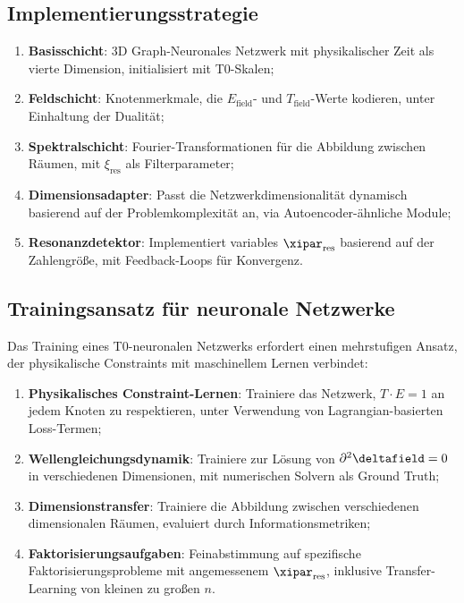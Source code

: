 \subsection{Implementierungsstrategie}
\label{subsec:implementation_strategy}
\begin{application}
	\begin{enumerate}
		\item \textbf{Basisschicht}: 3D Graph-Neuronales Netzwerk mit physikalischer Zeit als vierte Dimension, initialisiert mit T0-Skalen;
		\item \textbf{Feldschicht}: Knotenmerkmale, die $E_{\text{field}}$- und $T_{\text{field}}$-Werte kodieren, unter Einhaltung der Dualität;
		\item \textbf{Spektralschicht}: Fourier-Transformationen für die Abbildung zwischen Räumen, mit $\xi_{\text{res}}$ als Filterparameter;
		\item \textbf{Dimensionsadapter}: Passt die Netzwerkdimensionalität dynamisch basierend auf der Problemkomplexität an, via Autoencoder-ähnliche Module;
		\item \textbf{Resonanzdetektor}: Implementiert variables $\xipar_{\text{res}}$ basierend auf der Zahlengröße, mit Feedback-Loops für Konvergenz.
	\end{enumerate}
\end{application}
\subsection{Trainingsansatz für neuronale Netzwerke}
\label{subsec:training_approach}
Das Training eines T0-neuronalen Netzwerks erfordert einen mehrstufigen Ansatz, der physikalische Constraints mit maschinellem Lernen verbindet:
\begin{enumerate}
	\item \textbf{Physikalisches Constraint-Lernen}: Trainiere das Netzwerk, $T \cdot E = 1$ an jedem Knoten zu respektieren, unter Verwendung von Lagrangian-basierten Loss-Termen;
	\item \textbf{Wellengleichungsdynamik}: Trainiere zur Lösung von $\partial^2 \deltafield = 0$ in verschiedenen Dimensionen, mit numerischen Solvern als Ground Truth;
	\item \textbf{Dimensionstransfer}: Trainiere die Abbildung zwischen verschiedenen dimensionalen Räumen, evaluiert durch Informationsmetriken;
	\item \textbf{Faktorisierungsaufgaben}: Feinabstimmung auf spezifische Faktorisierungsprobleme mit angemessenem $\xipar_{\text{res}}$, inklusive Transfer-Learning von kleinen zu großen $n$.
\end{enumerate}
